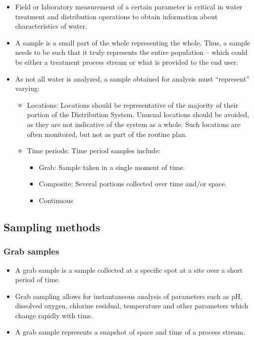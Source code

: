 		\begin{itemize}
			\item Field or laboratory measurement of a certain parameter is critical in water treatment and distribution operations to obtain information about characteristics of water.
			\item A sample is a small part of the whole representing the whole.  Thus, a sample needs to be such that it truly represents the entire population – which could be either a treatment process stream or what is provided to the end user.
			\item As not all water is analyzed, a sample obtained for analysis must “represent” varying:
			\begin{itemize}
			\item Locations:  Locations should be representative of the majority of their portion of the Distribution System. Unusual locations should be avoided, as they are not indicative of the system as a whole.  Such locations are often monitored, but not as part of the routine plan.

			\item Time periods: Time period samples include:
			\begin{itemize}
			\item Grab:  Sample taken in a single moment of time.
			\item Composite:  Several portions collected over time and/or space.
			\item Continuous

			\end{itemize}
		\end{itemize}
		\end{itemize}


\subsection{Sampling methods}

\subsubsection{Grab samples}
				\begin{itemize}
					\item A grab sample is a sample collected at a specific spot at a site over a short period of time.  
					\item Grab sampling allows for instantaneous analysis of parameters such as pH, dissolved oxygen, chlorine residual, temperature and other parameters which change rapidly with time.
					\item A grab sample represents a snapshot of space and time of a process stream.
					\end{itemize}


